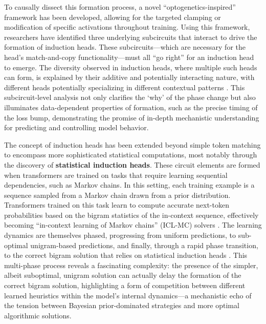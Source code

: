\documentclass[11pt]{article}
\begin{document}
To causally dissect this formation process, a novel ``optogenetics-inspired'' framework has been developed, allowing for the targeted clamping or modification of specific activations throughout training. Using this framework, researchers have identified three underlying subcircuits that interact to drive the formation of induction heads. These subcircuits---which are necessary for the head's match-and-copy functionality---must all ``go right'' for an induction head to emerge. The diversity observed in induction heads, where multiple such heads can form, is explained by their additive and potentially interacting nature, with different heads potentially specializing in different contextual patterns \cite{ref56}. This subcircuit-level analysis not only clarifies the `why' of the phase change but also illuminates data-dependent properties of formation, such as the precise timing of the loss bump, demonstrating the promise of in-depth mechanistic understanding for predicting and controlling model behavior.

The concept of induction heads has been extended beyond simple token matching to encompass more sophisticated statistical computations, most notably through the discovery of \textbf{statistical induction heads}. These circuit elements are formed when transformers are trained on tasks that require learning sequential dependencies, such as Markov chains. In this setting, each training example is a sequence sampled from a Markov chain drawn from a prior distribution. Transformers trained on this task learn to compute accurate next-token probabilities based on the bigram statistics of the in-context sequence, effectively becoming ``in-context learning of Markov chains'' (ICL-MC) solvers \cite{ref57}. The learning dynamics are themselves phased, progressing from uniform predictions, to sub-optimal unigram-based predictions, and finally, through a rapid phase transition, to the correct bigram solution that relies on statistical induction heads \cite{ref57}. This multi-phase process reveals a fascinating complexity: the presence of the simpler, albeit suboptimal, unigram solution can actually delay the formation of the correct bigram solution, highlighting a form of competition between different learned heuristics within the model's internal dynamics---a mechanistic echo of the tension between Bayesian prior-dominated strategies and more optimal algorithmic solutions.
\end{document}
